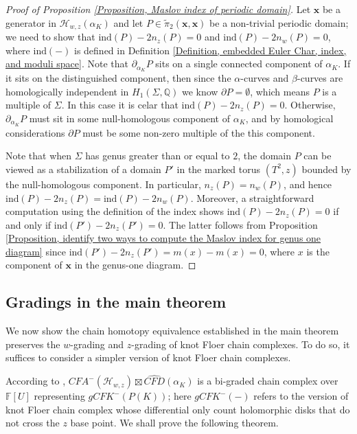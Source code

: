 \documentclass{amsart}
\theoremstyle{definition}
\theoremstyle{remark}
\numberwithin{equation}{section}
\numberwithin{equation}{section} \makeatletter
\begin{document}
\begin{proof}[Proof of Proposition \ref{Proposition, Maslov index of periodic domain}]
Let $\bm{x}$ be a generator in $\mathcal{H}_{w,z}(\alpha_{K})$ and let $P\in \tilde{\pi}_2(\bm{x},\bm{x})$ be a non-trivial periodic domain; we need to show that  $\text{ind}(P)-2n_z(P)=0$ and $\text{ind}(P)-2n_w(P)=0$, where $\text{ind}(-)$ is defined in Definition \ref{Definition, embedded Euler Char, index, and moduli space}. Note that $\partial _{\alpha_{K}}P$ sits on a single connected component of $\alpha_{K}$. If it sits on the distinguished component, then since the $\alpha$-curves and $\beta$-curves are homologically independent in $H_1(\Sigma,\mathbb{Q})$ we know $\partial P=\emptyset$, which means $P$ is a multiple of $\Sigma$.  In this case it is celar that $\text{ind}(P) - 2 n_z(P) = 0$. Otherwise, $\partial_{\alpha_{K}}P$ must sit in some null-homologous component of $\alpha_{K}$, and by homological considerations $\partial P$ must be some non-zero multiple of the this component. 
	
	Note that when $\Sigma$ has genus greater than or equal to $2$, the domain $P$ can be viewed as a stabilization of a domain $P'$ in the marked torus $(T^2,z)$ bounded by the null-homologous component. In particular, $n_z(P)=n_w(P)$, and hence $\text{ind}(P)-2n_z(P)=\text{ind}(P)-2n_w(P)$. Moreover, a straightforward computation using the definition of the index shows $\text{ind}(P)-2n_z(P)=0$ if and only if $\text{ind}(P')-2n_z(P')=0$. The latter follows from Proposition \ref{Proposition, identify two ways to compute the Maslov index for genus one diagram} since $\text{ind}(P')-2n_z(P')=m(x)-m(x)=0$, where $x$ is the component of $\bm{x}$ in the genus-one diagram.	
\end{proof}



\subsection{Gradings in the main theorem}\label{Subsection, gradings in the main theorem} We now show the chain homotopy equivalence established in the main theorem preserves the $w$-grading and $z$-grading of knot Floer chain complexes. To do so, it suffices to consider a simpler version of knot Floer chain complexes. 

According to \cite[Theorem 11.19]{LOT18}, ${CFA}^-(\mathcal{H}_{w,z})\boxtimes \widehat{CFD}(\alpha_K)$ is a bi-graded chain complex over $\mathbb{F}[U]$ representing ${gCFK}^-(P(K))$; here ${gCFK}^-(-)$ refers to the version of knot Floer chain complex whose differential only count holomorphic disks that do not cross the $z$ base point. We shall prove the following theorem. 
\end{document}
